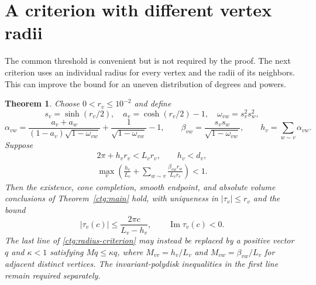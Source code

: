 \documentclass[11pt]{article}
\numberwithin{equation}{section}
\newtheorem{theorem}{Theorem}[section]
\theoremstyle{definition}
\theoremstyle{remark}
\newcommand{\Ima}{\operatorname{Im}}
\begin{document}
\section{A criterion with different vertex radii}
\label{ctg:variable-radii}

The common threshold is convenient but is not required by the proof.
The next criterion uses an individual radius for every vertex and
the radii of its neighbors. This can improve the bound for an uneven
distribution of degrees and powers.

\begin{theorem}\label{ctg:heterogeneous}
Choose $0<r_v\le10^{-2}$ and define
\begin{equation}\label{ctg:radius-data}
 s_v=\sinh(r_v/2),\quad a_v=\cosh(r_v/2)-1,\quad
 \omega_{vw}=s_v^2s_w^2,
\end{equation}
\begin{equation}\label{ctg:alpha-beta}
 \alpha_{vw}=\frac{a_v+a_w}{(1-a_v)\sqrt{1-\omega_{vw}}}
                +\frac1{\sqrt{1-\omega_{vw}}}-1,
 \qquad
 \beta_{vw}=\frac{s_vs_w}{\sqrt{1-\omega_{vw}}},
 \qquad h_v=\sum_{w\sim v}\alpha_{vw}.
\end{equation}
Suppose
\begin{equation}\label{ctg:radius-criterion}
 \begin{gathered}
 2\pi+h_vr_v<L_vr_v,\qquad h_v<d_v,\\
 \max_v\left(\frac{h_v}{L_v}
       +\sum_{w\sim v}\frac{\beta_{vw}r_w}{L_vr_v}\right)<1.
 \end{gathered}
\end{equation}
Then the existence, cone completion, smooth endpoint, and absolute
volume conclusions of Theorem~\ref{ctg:main} hold, with uniqueness
in $|\tau_v|\le r_v$ and the bound
\begin{equation}\label{ctg:radius-bound}
 |\tau_v(c)|\le\frac{2\pi c}{L_v-h_v},\qquad \Ima\tau_v(c)<0.
\end{equation}
The last line of \eqref{ctg:radius-criterion} may instead be replaced
by a positive vector $q$ and $\kappa<1$ satisfying $Mq\le\kappa q$,
where $M_{vv}=h_v/L_v$ and $M_{vw}=\beta_{vw}/L_v$ for adjacent
distinct vertices. The invariant-polydisk inequalities in the first
line remain required separately.
\end{theorem}
\end{document}
